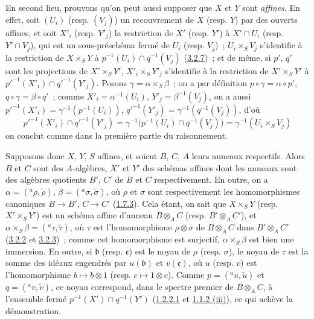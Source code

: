 En second lieu, prouvons qu'on peut aussi supposer que $X$ et $Y$ sont
\emph{affines}. En effet, soit $(U_i)$ (resp. $(V_j)$) un recouvrement de $X$
(resp. $Y$) par des ouverts affines, et soit $X'_i$ (resp. $Y'_j$) la
restriction de $X'$ (resp. $Y'$) à $X'\cap U_i$ (resp. $Y'\cap V_j$), qui est
un sous-préschéma fermé de $U_i$ (resp. $V_j$)~; $U_i\times_S V_j$ s'identifie
à la restriction de $X\times_S Y$ à
$p^{-1}(U_i)\cap q^{-1}(V_j)$ (\hyperref[I.3.2.7-fr]{3.2.7})~; et de même, si
$p'$, $q'$ sont les projections de $X'\times_S Y'$,
$X'_i\times_S Y'_j$ s'identifie à la restriction de $X'\times_S Y'$ à
${p'}^{-1}(X'_i)\cap{q'}^{-1}(Y'_j)$. Posons
$\gamma=\alpha\times_S\beta$~; on a par définition
$p\circ\gamma=\alpha\circ p'$, $q\circ\gamma=\beta\circ q'$~; comme
$X'_i=\alpha^{-1}(U_i)$, $Y'_j=\beta^{-1}(V_j)$, on a aussi
${p'}^{-1}(X'_i)=\gamma^{-1}(p^{-1}(U_i))$,
${q'}^{-1}(Y'_j)=\gamma^{-1}(q^{-1}(V_j))$, d'où
\[
  {p'}^{-1}(X'_i)\cap{q'}^{-1}(Y'_j)
  =\gamma^{-1}\bigl(p^{-1}(U_i)\cap q^{-1}(V_j)\bigr)
  =\gamma^{-1}(U_i\times_S V_j)
\]
on conclut comme dans la première partie du raisonnement.

Supposons donc $X$, $Y$, $S$ affines, et soient $B$, $C$, $A$ leurs anneaux
respectifs. Alors $B$ et $C$ sont des $A$-algèbres, $X'$ et $Y'$ des schémas
affines dont les anneaux sont des algèbres quotients $B'$, $C'$ de $B$ et
$C$ respectivement. En outre, on a
$\alpha=({}^a\rho,\widetilde{\rho})$, $\beta=({}^a\sigma,\widetilde{\sigma})$,
où $\rho$ et $\sigma$ sont respectivement les homomorphismes canoniques
$B\to B'$, $C\to C'$ (\hyperref[I.1.7.3-fr]{1.7.3}). Cela étant, on sait que
$X\times_S Y$ (resp. $X'\times_S Y'$) est un schéma affine d'anneau
$B\otimes_A C$ (resp. $B'\otimes_A C'$), et
$\alpha\times_S\beta=({}^a\tau,\widetilde{\tau})$, où $\tau$ est
l'homomorphisme $\rho\otimes\sigma$ de $B\otimes_A C$ dans
$B'\otimes_A C'$ (\hyperref[I.3.2.2-fr]{3.2.2} et
\hyperref[I.3.2.3-fr]{3.2.3})~; comme cet homomorphisme est surjectif,
$\alpha\times_S\beta$ est bien une immersion. En outre, si $\mathfrak{b}$
(resp. $\mathfrak{c}$) est le noyau de $\rho$ (resp. $\sigma$), le noyau de
$\tau$ est la somme des idéaux engendrés par $u(\mathfrak{b})$ et $v(\mathfrak{c})$, où $u$ (resp. $v$) est
l'homomorphisme $b\mapsto b\otimes1$ (resp. $c\mapsto1\otimes c$). Comme
$p=({}^a u,\widetilde{u})$ et $q=({}^a v,\widetilde{v})$, ce noyau correspond,
dans le spectre premier de $B\otimes_A C$, à l'ensemble fermé
$p^{-1}(X')\cap q^{-1}(Y')$ (\hyperref[I.1.2.2.1-fr]{1.2.2.1} et
\hyperref[I.1.1.2-fr]{1.1.2 (iii)}), ce qui achève la démonstration.

